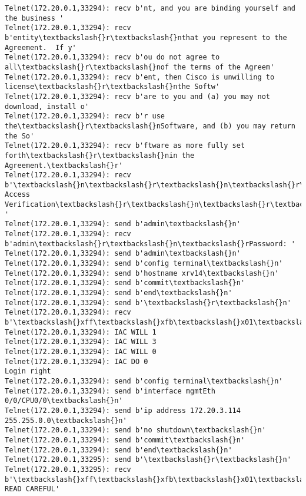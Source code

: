 \documentclass[11pt]{article}
\begin{document}
\begin{Verbatim}[commandchars=\\\{\}]
Telnet(172.20.0.1,33294): recv b'nt, and you are binding yourself and the business '
Telnet(172.20.0.1,33294): recv b'entity\textbackslash{}r\textbackslash{}nthat you represent to the Agreement.  If y'
Telnet(172.20.0.1,33294): recv b'ou do not agree to all\textbackslash{}r\textbackslash{}nof the terms of the Agreem'
Telnet(172.20.0.1,33294): recv b'ent, then Cisco is unwilling to license\textbackslash{}r\textbackslash{}nthe Softw'
Telnet(172.20.0.1,33294): recv b'are to you and (a) you may not download, install o'
Telnet(172.20.0.1,33294): recv b'r use the\textbackslash{}r\textbackslash{}nSoftware, and (b) you may return the So'
Telnet(172.20.0.1,33294): recv b'ftware as more fully set forth\textbackslash{}r\textbackslash{}nin the Agreement.\textbackslash{}r'
Telnet(172.20.0.1,33294): recv b'\textbackslash{}n\textbackslash{}r\textbackslash{}n\textbackslash{}r\textbackslash{}nUser Access Verification\textbackslash{}r\textbackslash{}n\textbackslash{}r\textbackslash{}nUsername: '
Telnet(172.20.0.1,33294): send b'admin\textbackslash{}n'
Telnet(172.20.0.1,33294): recv b'admin\textbackslash{}r\textbackslash{}n\textbackslash{}rPassword: '
Telnet(172.20.0.1,33294): send b'admin\textbackslash{}n'
Telnet(172.20.0.1,33294): send b'config terminal\textbackslash{}n'
Telnet(172.20.0.1,33294): send b'hostname xrv14\textbackslash{}n'
Telnet(172.20.0.1,33294): send b'commit\textbackslash{}n'
Telnet(172.20.0.1,33294): send b'end\textbackslash{}n'
Telnet(172.20.0.1,33294): send b'\textbackslash{}r\textbackslash{}n'
Telnet(172.20.0.1,33294): recv b'\textbackslash{}xff\textbackslash{}xfb\textbackslash{}x01\textbackslash{}xff\textbackslash{}xfb\textbackslash{}x03\textbackslash{}xff\textbackslash{}xfb\textbackslash{}x00\textbackslash{}xff\textbackslash{}xfd\textbackslash{}x00\textbackslash{}x1b]0;xrv14\textbackslash{}x07\textbackslash{}r\textbackslash{}n\textbackslash{}rRP/0/0/CPU0:xrv14\#\textbackslash{}r\textbackslash{}n\textbackslash{}rRP/0'
Telnet(172.20.0.1,33294): IAC WILL 1
Telnet(172.20.0.1,33294): IAC WILL 3
Telnet(172.20.0.1,33294): IAC WILL 0
Telnet(172.20.0.1,33294): IAC DO 0
Login right
Telnet(172.20.0.1,33294): send b'config terminal\textbackslash{}n'
Telnet(172.20.0.1,33294): send b'interface mgmtEth 0/0/CPU0/0\textbackslash{}n'
Telnet(172.20.0.1,33294): send b'ip address 172.20.3.114 255.255.0.0\textbackslash{}n'
Telnet(172.20.0.1,33294): send b'no shutdown\textbackslash{}n'
Telnet(172.20.0.1,33294): send b'commit\textbackslash{}n'
Telnet(172.20.0.1,33294): send b'end\textbackslash{}n'
Telnet(172.20.0.1,33295): send b'\textbackslash{}r\textbackslash{}n'
Telnet(172.20.0.1,33295): recv b'\textbackslash{}xff\textbackslash{}xfb\textbackslash{}x01\textbackslash{}xff\textbackslash{}xfb\textbackslash{}x03\textbackslash{}xff\textbackslash{}xfb\textbackslash{}x00\textbackslash{}xff\textbackslash{}xfd\textbackslash{}x00\textbackslash{}x1b]0;xrv15\textbackslash{}x07\textbackslash{}r\textbackslash{}n\textbackslash{}r\textbackslash{}nIMPORTANT:  READ CAREFUL'

\end{Verbatim}
\end{document}
